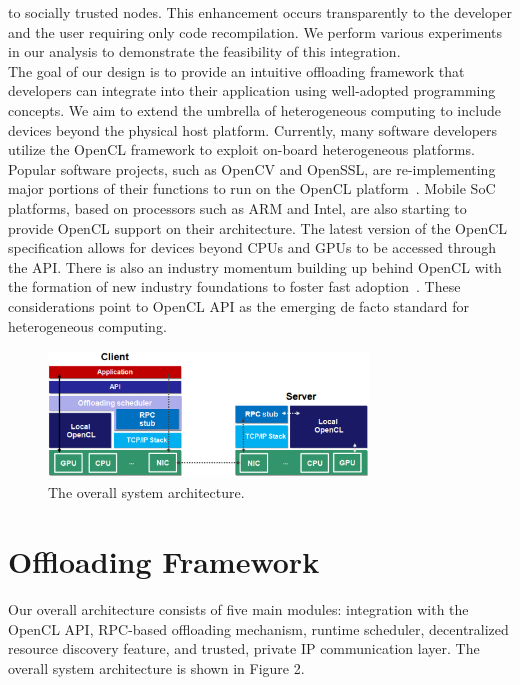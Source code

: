 \documentclass[10pt, conference, compsocconf]{IEEEtran}
\begin{document}
to socially trusted nodes.
%
This enhancement occurs transparently to the developer and the user 
requiring only code recompilation.
%
We perform various experiments in our analysis to demonstrate the 
feasibility of this integration.\\
%
\indent The goal of our design is to provide an intuitive offloading framework that 
developers can integrate into their application using well-adopted 
programming concepts.
%
We aim to extend the umbrella of heterogeneous computing to include devices
beyond the physical host platform.
%
Currently, many software developers utilize the OpenCL framework to exploit 
on-board heterogeneous platforms.
%
Popular software projects, such as OpenCV and OpenSSL, are re-implementing
major portions of their functions to run on the OpenCL
platform~\cite{opencv}.
%
Mobile SoC platforms, based on processors such as ARM and Intel, are also 
starting to provide OpenCL support on their architecture.
%
The latest version of the OpenCL specification allows for devices beyond 
CPUs and GPUs to be accessed through the API. 
%
There is also an industry momentum building up behind OpenCL with the
formation of new industry foundations to foster fast adoption~\cite{hsa}. 
%
These considerations point to OpenCL API as the emerging de facto standard 
for heterogeneous computing.
%
\begin{figure}
\centering
\includegraphics[height=3.4cm, width=8.5cm]{Figure/architecture}
\caption{The overall system architecture.}
\end{figure}
%
\section{Offloading Framework}
%
Our overall architecture consists of five main modules: integration with the 
OpenCL API, RPC-based offloading mechanism, runtime scheduler, decentralized resource discovery 
feature, and trusted, private IP communication layer.
%
The overall system architecture is shown in Figure 2.
%
\end{document}
